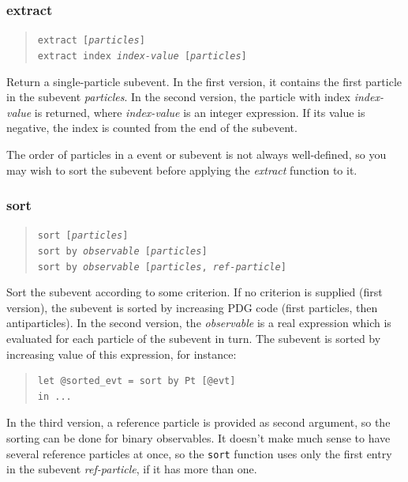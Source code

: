 \documentclass[12pt]{book}
\newcommand{\ttt}[1]{\texttt{#1}}
\begin{document}
\subsubsection{extract}
\begin{quote}
\begin{footnotesize}
  \ttt{extract [\textit{particles}]}   \\ 
  \ttt{extract index \textit{index-value} [\textit{particles}]}
\end{footnotesize}
\end{quote}
Return a single-particle subevent.  In the first version, it contains the
first particle in the subevent \textit{particles}.  In the second version, the
particle with index \textit{index-value} is returned, where
\textit{index-value} is an integer expression.  If its value is negative, the
index is counted from the end of the subevent.

The order of particles in a event or subevent is not always well-defined, so
you may wish to sort the subevent before applying the \textit{extract}
function to it.

\subsubsection{sort}
\begin{quote}
\begin{footnotesize}
   \ttt{sort [\textit{particles}]} \\
   \ttt{sort by \textit{observable} [\textit{particles}]}   \\ 
   \ttt{sort by \textit{observable} [\textit{particles}, \textit{ref-particle}]}
\end{footnotesize}
\end{quote}
Sort the subevent according to some criterion.  If no criterion is supplied
(first version), the subevent is sorted by increasing PDG code (first
particles, then antiparticles).  In the second version, the
\textit{observable} is a real expression which is evaluated for each particle
of the subevent in turn.  The subevent is sorted by increasing value of this
expression, for instance:
\begin{quote}
\begin{footnotesize}
\begin{verbatim}
let @sorted_evt = sort by Pt [@evt]
in ...
\end{verbatim}
\end{footnotesize}
\end{quote}
In the third version, a reference particle is provided as second argument, so
the sorting can be done for binary observables.  It doesn't make much sense to
have several reference particles at once, so the \ttt{sort} function uses
only the first entry in the subevent \textit{ref-particle}, if it has more
than one.
\end{document}
